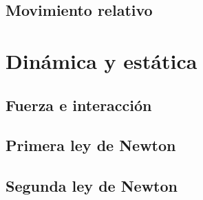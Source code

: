 ﻿\documentclass[11pt,letterpaper,openany]{book}
\newcommand{\rutaraiz}{../..}
\begin{document}

\chapter{Movimiento relativo}





\part{Dinámica y estática}



\chapter{Fuerza e interacción}





\chapter{Primera ley de Newton}





\chapter{Segunda ley de Newton}


\end{document}
